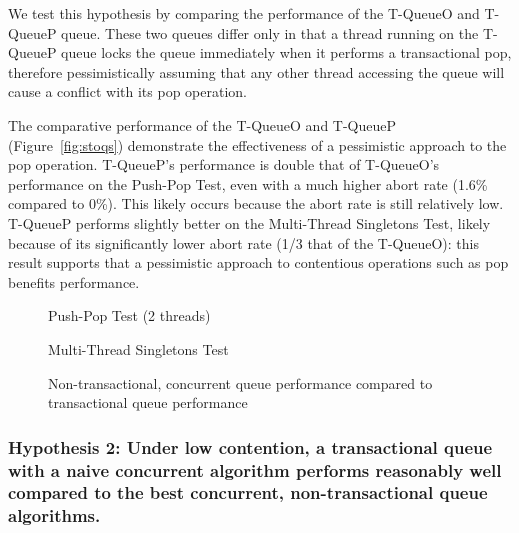 We test this hypothesis by comparing the performance of the T-QueueO and T-QueueP queue. These two queues differ only in that a thread running on the T-QueueP queue locks the queue immediately when it performs a transactional pop, therefore pessimistically assuming that any other thread accessing the queue will cause a conflict with its pop operation.

The comparative performance of the T-QueueO and T-QueueP (Figure~\ref{fig:stoqs}) demonstrate the effectiveness of a pessimistic approach to the pop operation. T-QueueP's performance is double that of T-QueueO's performance on the Push-Pop Test, even with a much higher abort rate (1.6\% compared to 0\%). This likely occurs because the abort rate is still relatively low. T-QueueP performs slightly better on the Multi-Thread Singletons Test, likely because of its significantly lower abort rate (1/3 that of the T-QueueO): this result supports that a pessimistic approach to contentious operations such as pop benefits performance. 

\vspace{12pt}
\noindent{}

\begin{figure}[H]
    \centering
	\begin{minipage}{0.75\textwidth}
        \caption*{Push-Pop Test (2 threads)}
        \vspace{12pt}
	\end{minipage}
   	\begin{minipage}{0.75\textwidth}
        \caption*{Multi-Thread Singletons Test}
	\end{minipage}
        \caption{Non-transactional, concurrent queue performance compared to transactional queue performance}
    \label{fig:ntqs}
\end{figure}

\subsubsection{Hypothesis 2: Under low contention, a transactional queue with a naive concurrent algorithm performs reasonably well compared to the best concurrent, non-transactional queue algorithms.}

